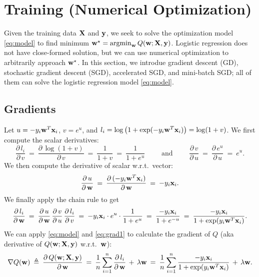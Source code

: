\documentclass[11pt]{article}
\numberwithin{equation}{section}
\def\w{{\bf w}}
\def\X{{\bf X}}
\def\x{{\bf x}}
\def\y{{\bf y}}
\def\argmin{\mathop{\rm argmin}}
\def\argmin{\mathop{\rm argmin}}
\begin{document}
\section{Training (Numerical Optimization)}


Given the training data $\X$ and $\y$, we seek to solve the optimization model \eqref{eq:model} to find minimum $\w^\star = \argmin_{\w} Q (\w ; \X , \y )$.
Logistic regression does not have close-formed solution, but we can use numerical optimization to arbitrarily approach $\w^\star$.
In this section, we introdue gradient descent (GD), stochastic gradient descent (SGD), accelerated SGD, and mini-batch SGD; all of them can solve the logistic regression model \eqref{eq:model}.



\subsection{Gradients} \label{sec:alg:grad}

Let $u = -y_i \w^T \x_i $, $v = e^u$, and $l_i = \log \big( 1 + \exp ( - y_i \w^T \x_i ) \big) = \log (1 + v)$.
We first compute the scalar derivatives:
\begin{equation*}
\frac{ \partial \, l_i }{\partial \, v}
\: = \: \frac{ \partial \, \log (1 + v) }{\partial \, v}
\: = \: \frac{1}{1+v} 
\: = \: \frac{1}{1+e^u}
\qquad \textrm{ and } \qquad
\frac{ \partial \, v }{\partial \, u}
\: = \: \frac{ \partial \, e^u }{\partial \, u}
\: = \: e^u  .
\end{equation*}
We then compute the derivative of scalar w.r.t.\ vector:
\begin{equation*}
\frac{ \partial \, u }{\partial \, \w }
\: = \: \frac{ \partial \, (-y_i \w^T \x_i) }{\partial \, \w }
\: = \: - y_i \x_i .
\end{equation*}
We finally apply the chain rule to get 
\begin{equation} \label{eq:grad1}
\frac{ \partial \, l_i }{\partial \, \w }
\: = \: \frac{ \partial \, u }{\partial \, \w } \, \frac{ \partial \, v }{\partial \, u } 
\, \frac{ \partial \, l_i }{\partial \, v} 
\: = \:  - y_i \x_i  \cdot e^u \cdot \frac{1}{1+e^u}
\: = \: \frac{ - y_i \x_i }{1+e^{-u}}
\: = \: \frac{ - y_i \x_i }{1+\exp({y_i \w^T \x_i})} .
\end{equation}
We can apply \eqref{eq:model} and \eqref{eq:grad1} to calculate the gradient of $Q$ (aka derivative of $Q (\w; \X , \y)$ w.r.t.\ $\w$):
\begin{equation*}\label{eq:grad2}
\nabla Q (\w) 
\: \triangleq \:
\frac{ \partial \, Q (\w ; \X , \y) }{\partial \, \w }
\: = \: \frac{1}{n} \sum_{i=1}^n \frac{ \partial \, l_i }{\partial \, \w } \, + \, \lambda \w 
\: = \: \frac{1}{n} \sum_{i=1}^n \frac{ -y_i \x_i }{1+\exp({y_i \w^T \x_i})} \, + \, \lambda \w  .
\end{equation*}
\end{document}
